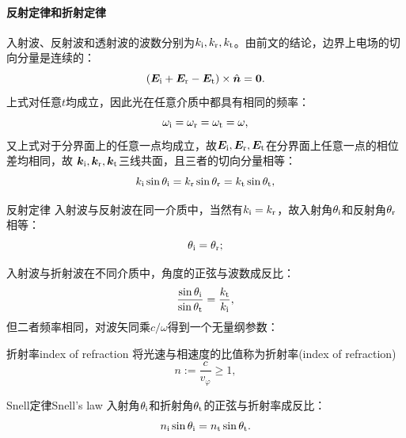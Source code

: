\paragraph{反射定律和折射定律}

入射波、反射波和透射波的波数分别为$k_{\mathrm{i}},k_\text r,k_\text t$。由前文的结论，边界上电场的切向分量是连续的：
\[
    (\bm E_{\mathrm{i}}+\bm E_\text r-\bm E_\text t)\times\mathop{}\!\hat{\bm{n}}=\bm 0.
\]
上式对任意$t$均成立，因此光在任意介质中都具有相同的频率：
\begin{equation}
    \label{eqn:omegai=omegar=omegat}
    \omega_{\mathrm{i}}=\omega_\text r=\omega_\text t=\omega,
\end{equation}
又上式对于分界面上的任意一点均成立，故$\bm E_{\mathrm{i}},\bm E_\text r,\bm E_\text t$在分界面上任意一点的相位差均相同，故
$\bm k_{\mathrm{i}},\bm k_\text r,\bm k_\text t$三线共面，且三者的切向分量相等：
\begin{equation}
    k_{\mathrm{i}}\sin\theta_{\mathrm{i}}=k_\text r\sin\theta_\text r=k_\text t\sin\theta_\text t,
\end{equation}

\begin{theorem}{反射定律}{}
    入射波与反射波在同一介质中，当然有$k_{\mathrm{i}}=k_\text r$，故入射角$\theta_{\mathrm{i}}$和反射角$\theta_\text r$相等：
    \begin{equation}
        \theta_{\mathrm{i}}=\theta_\text r;
    \end{equation}
\end{theorem}
入射波与折射波在不同介质中，角度的正弦与波数成反比：
\[
    \frac{\sin\theta_{\mathrm{i}}}{\sin\theta_\text t}=\frac{k_\text t}{k_{\mathrm{i}}},
\]
但二者频率相同，对波矢同乘$c/\omega$得到一个无量纲参数：
\begin{definition}
    {折射率}{index of refraction}
    将光速与相速度的比值称为折射率(index of refraction)
    \begin{equation}
        n:=\frac c{v_\varphi}\geqslant1,
    \end{equation}
\end{definition}
\begin{theorem}{Snell定律}{Snell's law}
    入射角$\theta_{\mathrm{i}}$和折射角$\theta_\text t$的正弦与折射率成反比：
    \begin{equation}
        \label{eqn:Snell}
        n_{\mathrm{i}}\sin\theta_{\mathrm{i}}=n_\text t\sin\theta_\text t.
    \end{equation}
\end{theorem}

